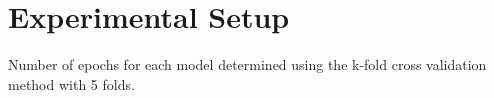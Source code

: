 \section{Experimental Setup}

Number of epochs for each model determined using the k-fold cross validation method with 5 folds.